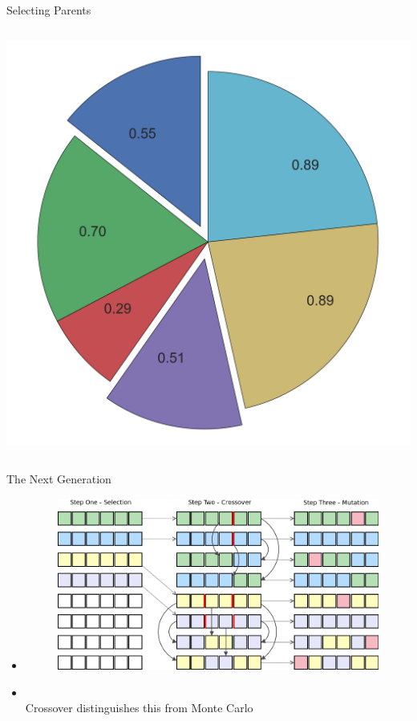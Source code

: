 \documentclass[10pt]{beamer}
\begin{document}
\begin{frame}{Selecting Parents}
\begin{columns}[c]
\begin{column}{0.48\textwidth}
\begin{overprint}
				\includegraphics[width=\linewidth]{images/pie2.png}
			\end{overprint}
		\end{column}	
	\end{columns}
\end{frame}

{%
\begin{frame}{The Next Generation}
	\begin{itemize}[<+->]
		\item[]{
		\begin{figure}
			\includegraphics[width=0.9\linewidth]{images/Genes_turingFinance.png}
		\end{figure}}
		\item[]{~\\Crossover distinguishes this from Monte Carlo}
	\end{itemize}
\end{frame}
}
\end{document}
